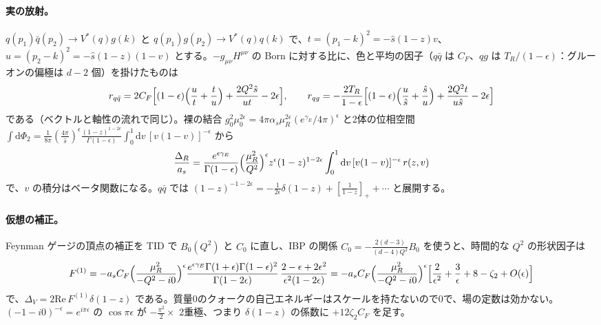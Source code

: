 \documentclass[a4paper,10pt]{ltjsarticle}
\newcommand{\dd}{\mathrm{d}}
\newcommand{\re}{\mathrm{Re}\,}
\begin{document}
\paragraph{実の放射。}$q(p_1)\bar q(p_2)\to V^*(q)g(k)$ と $q(p_1)g(p_2)\to V^*(q)q(k)$ で、$t=(p_1-k)^2=-\hat s(1-z)v$、$u=(p_2-k)^2=-\hat s(1-z)(1-v)$ とする。$-g_{\mu\nu}H^{\mu\nu}$ の Born に対する比に、色と平均の因子（$q\bar q$ は $C_F$、$qg$ は $T_R/(1-\epsilon)$：グルーオンの偏極は $d-2$ 個）を掛けたものは
\begin{equation}
r_{q\bar q}=2C_F\Bigl[(1-\epsilon)\Bigl(\frac ut+\frac tu\Bigr)+\frac{2Q^2\hat s}{ut}-2\epsilon\Bigr],\qquad
r_{qg}=-\frac{2T_R}{1-\epsilon}\Bigl[(1-\epsilon)\Bigl(\frac u{\hat s}+\frac{\hat s}u\Bigr)+\frac{2Q^2t}{u\hat s}-2\epsilon\Bigr]
\label{eq:real}
\end{equation}
である（ベクトルと軸性の流れで同じ）。裸の結合 $g_0^2\mu_0^{2\epsilon}=4\pi\alpha_s\mu_R^{2\epsilon}(e^{\gamma_E}/4\pi)^\epsilon$ と2体の位相空間 $\int\dd\Phi_2=\frac1{8\pi}(\frac{4\pi}{\hat s})^\epsilon\frac{(1-z)^{1-2\epsilon}}{\Gamma(1-\epsilon)}\int_0^1\dd v\,[v(1-v)]^{-\epsilon}$ から
\begin{equation}
\frac{\Delta_R}{a_s}=\frac{e^{\epsilon\gamma_E}}{\Gamma(1-\epsilon)}\Bigl(\frac{\mu_R^2}{Q^2}\Bigr)^\epsilon z^\epsilon(1-z)^{1-2\epsilon}\int_0^1\dd v\,[v(1-v)]^{-\epsilon}\,r(z,v)
\label{eq:dr}
\end{equation}
で、$v$ の積分はベータ関数になる。$q\bar q$ では $(1-z)^{-1-2\epsilon}=-\frac1{2\epsilon}\delta(1-z)+[\frac1{1-z}]_++\cdots$ と展開する。

\paragraph{仮想の補正。}Feynman ゲージの頂点の補正を TID で $B_0(Q^2)$ と $C_0$ に直し、IBP の関係 $C_0=-\frac{2(d-3)}{(d-4)Q^2}B_0$ を使うと、時間的な $Q^2$ の形状因子は
\begin{equation}
F^{(1)}=-a_sC_F\Bigl(\frac{\mu_R^2}{-Q^2-i0}\Bigr)^\epsilon\frac{e^{\epsilon\gamma_E}\Gamma(1+\epsilon)\Gamma(1-\epsilon)^2}{\Gamma(1-2\epsilon)}\,\frac{2-\epsilon+2\epsilon^2}{\epsilon^2(1-2\epsilon)}
=-a_sC_F\Bigl(\frac{\mu_R^2}{-Q^2-i0}\Bigr)^\epsilon\Bigl[\frac2{\epsilon^2}+\frac3\epsilon+8-\zeta_2+O(\epsilon)\Bigr]
\label{eq:ff}
\end{equation}
で、$\Delta_V=2\re F^{(1)}\delta(1-z)$ である。質量0のクォークの自己エネルギーはスケールを持たないので0で、場の定数は効かない。$(-1-i0)^{-\epsilon}=e^{i\pi\epsilon}$ の $\cos\pi\epsilon$ が $-\frac{\pi^2}2\times$ 2重極、つまり $\delta(1-z)$ の係数に $+12\zeta_2C_F$ を足す。
\end{document}
